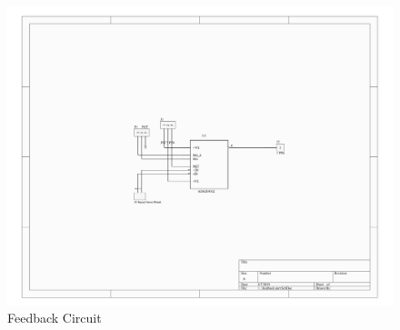\documentclass[a4paper,12pt]{article}
\begin{document}
\begin{figure}[H]
    \centering
    \includegraphics[angle=270,origin=c,scale=0.27]{Fig_06-1.jpg}
    \caption{Feedback Circuit}
    \label{fig:Feedback Circuit}
\end{figure}
\end{document}
